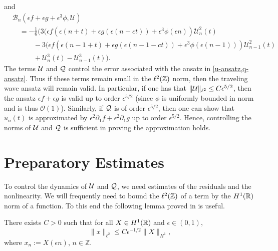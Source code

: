 and 
\begin{equation}
\begin{aligned}
	&\mathcal B_n(\epsilon f + \epsilon g + \epsilon^3 \phi, \mathcal U) \\
	&\quad= -\frac 1 6 \Big( 3(\epsilon f(\epsilon(n+t) + \epsilon g(\epsilon(n-ct)) + \epsilon^3 \phi(\epsilon n))  \mathcal U^2_n(t) \\
	&\quad \qquad - 3(\epsilon f(\epsilon(n-1+t) + \epsilon g(\epsilon(n-1-ct)) + \epsilon^3 \phi(\epsilon (n-1)))  \mathcal U^2_{n-1}(t) \\
	&\quad\qquad + \mathcal U_n^3(t)  - \mathcal U_{n-1}^3(t)\Big).
\end{aligned}
\end{equation}
The terms \(\mathcal{U}\) and \(\mathcal{Q}\) control the error associated with the ansatz in \cref{u-ansatz,q-ansatz}. Thus if these terms remain small in the \(\ell^2(\mathbb{Z})\) norm, then the traveling wave ansatz will remain valid. In particular, if one has that \(\|\mathcal{U}\|_{\ell^2} \leq C\epsilon^{5/2}\), then the ansatz \(\epsilon f + \epsilon g\) is valid up to order \(\epsilon^{5/2}\) (since \(\phi\) is uniformly bounded in norm and is thus \(\mathcal O (1)\)). Similarly, if \(\mathcal{Q}\) is of order \(\epsilon^{5/2}\), then one can show that \(\dot u_n(t)\) is approximated by \(\epsilon^2 \partial_1 f + \epsilon^2 \partial_1 g\) up to order \(\epsilon^{5/2}\). Hence, controlling the norms of \(\mathcal{U}\) and \(\mathcal{Q}\) is sufficient in proving the approximation holds.

\section{Preparatory Estimates}
 
To control the dynamics of \(\mathcal{U}\) and \(\mathcal{Q}\), we need estimates of the residuals and the nonlinearity. We will frequently need to bound the \(\ell^2(\mathbb{Z})\) of a term by the \(H^1(\mathbb{R})\) norm of a function. To this end the following lemma proved in \cite{dumas2014justification} is useful.
\begin{lem}\label{h1-ell2-ineq}
	There exists \(C>0\) such that for all \(X \in H^1(\mathbb{R})\) and \(\epsilon \in (0,1)\), \[\|x\|_{\ell^2} \leq C \epsilon^{-1/2} \|X\|_{H^1},\] where \(x_n := X(\epsilon n)\), \(n\in \mathbb Z\).
\end{lem}


